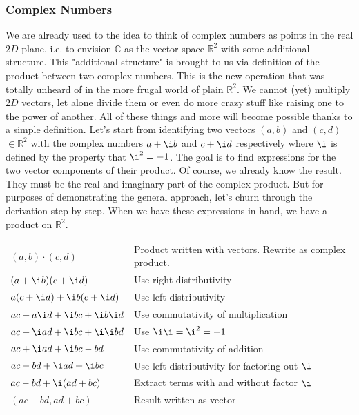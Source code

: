 \subsubsection{Complex Numbers}
We are already used to the idea to think of complex numbers as points in the real $2D$ plane, i.e. to envision $\mathbb{C}$ as the vector space $\mathbb{R}^2$ with some additional structure. This "additional structure" is brought to us via definition of the product between two complex numbers. This is the new operation that was totally unheard of in the more frugal world of plain $\mathbb{R}^2$. We cannot (yet) multiply $2D$ vectors, let alone divide them or even do more crazy stuff like raising one to the power of another. All of these things and more will become possible thanks to a simple definition. Let's start from identifying two vectors $(a,b)$ and $(c,d)$ $\in \mathbb{R}^2$ with the complex numbers $a + \i b$  and $c + \i d$ respectively where $\i$ is defined by the property that $\i^2 = -1$. The goal is to find expressions for the two vector components of their product. Of course, we already know the result. They must be the real and imaginary part of the complex product. But for purposes of demonstrating the general approach, let's churn through the derivation step by step. When we have these expressions in hand, we have a product on $\mathbb{R}^2$. 

\medskip
\begin{tabular}{l l}
$(a,b) \cdot (c,d)$                  & Product written with vectors. Rewrite as complex product. \\
$(a + \i b) (c + \i d)$              & Use right distributivity\\
$a (c + \i d) + \i b (c + \i d)$     & Use left distributivity \\
$a c + a \i d + \i b c + \i b \i d$  & Use commutativity of multiplication  \\
$a c + \i a d + \i b c + \i \i b d$  & Use $\i \i = \i^2 = -1$  \\
$a c + \i a d + \i b c - b d$        & Use commutativity of addition  \\
$a c - b d   + \i a d + \i b c$      & Use left distributivity for factoring out $\i$  \\
$a c - b d   + \i (a d + b c)$       & Extract terms with and without factor $\i$  \\
$(a c - b d, a d + b c)$             & Result written as vector  \\
\end{tabular}
\medskip

